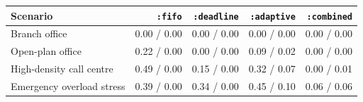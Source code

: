 \begin{tabular}{lrrrr}
\toprule
Scenario & \texttt{:fifo} & \texttt{:deadline} & \texttt{:adaptive} & \texttt{:combined} \\
\midrule
Branch office & 0.00 / 0.00 & 0.00 / 0.00 & 0.00 / 0.00 & 0.00 / 0.00 \\
Open-plan office & 0.22 / 0.00 & 0.00 / 0.00 & 0.09 / 0.02 & 0.00 / 0.00 \\
High-density call centre & 0.49 / 0.00 & 0.15 / 0.00 & 0.32 / 0.07 & 0.00 / 0.01 \\
Emergency overload stress & 0.39 / 0.00 & 0.34 / 0.00 & 0.45 / 0.10 & 0.06 / 0.06 \\
\bottomrule
\end{tabular}
